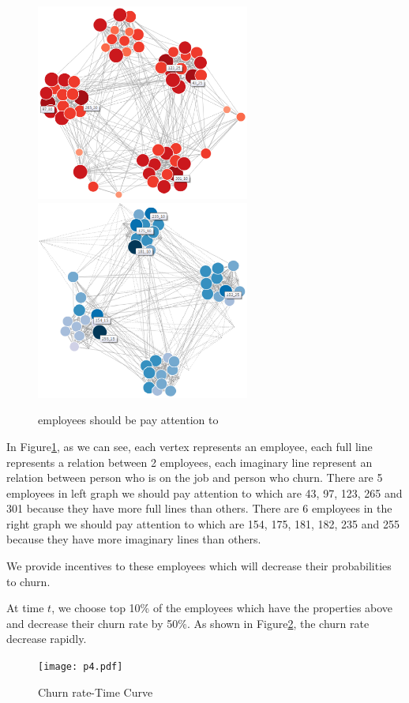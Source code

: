 \documentclass[12pt,a4paper,titlepage]{article}
\begin{document}
\begin{figure}[htb]
  \centering
  \includegraphics[width=7cm]{p1.eps}
  \includegraphics[width=7cm]{p2.eps}
  \caption{employees should be pay attention
    to}\label{incentive-mechanism}
\end{figure}

In Figure\ref{incentive-mechanism}, as we can see, each vertex
represents an employee, each full line represents a relation between 2
employees, each imaginary line represent an relation between person
who is on the job and person who churn. There are 5
employees in left graph we should pay attention to which are
43, 97, 123, 265 and 301 because they have more full lines than
others. There are 6 employees in the right graph we should pay
attention to which are 154, 175, 181, 182, 235 and 255 because they
have more imaginary lines than others.

We provide incentives to these employees which will decrease their
probabilities to churn.

At time $t$, we choose top 10\% of the employees which have the
properties above and decrease their churn rate by 50\%. As shown in
Figure\ref{churn-rate}, the churn rate decrease rapidly.

\begin{figure}[htb]
  \centering
  \texttt{[image: p4.pdf]}
  \caption{Churn rate-Time Curve}
  \label{churn-rate}
\end{figure}
\end{document}
